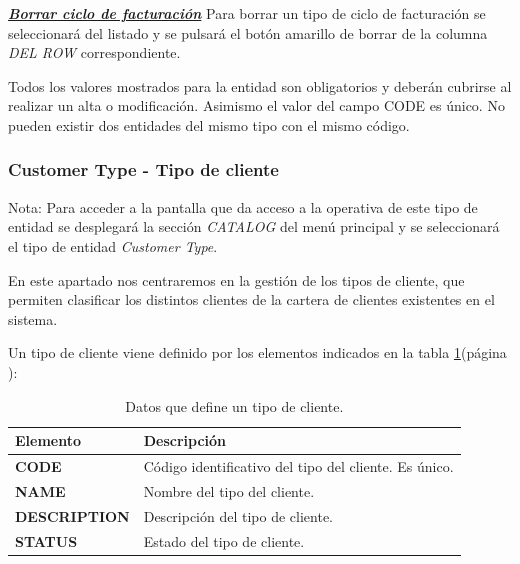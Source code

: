 \underline{\textsl{\textbf{Borrar ciclo de facturación}}}\newline
Para borrar un tipo de ciclo de facturación se seleccionará del listado y se pulsará el botón amarillo de borrar de la columna \textit{DEL ROW} correspondiente.\newline

Todos los valores mostrados para la entidad son obligatorios y deberán cubrirse al realizar un alta o modificación. Asimismo el valor del campo CODE es único. No pueden existir dos entidades del mismo tipo con el mismo código.



\subsubsection{Customer Type - Tipo de cliente}
\label{sub:customer-type}

Nota: Para acceder a la pantalla que da acceso a la operativa de este tipo de entidad se desplegará la sección \emph{CATALOG} del menú principal y se seleccionará el tipo de entidad \emph{Customer Type}.

En este apartado nos centraremos en la gestión de los tipos de cliente, que permiten clasificar los distintos clientes de la cartera de clientes existentes en el sistema.


Un tipo de cliente viene definido por los elementos indicados en la tabla \ref{tab:tipo-cliente}(página \pageref{tab:tipo-cliente}):



\begin{table}[H]
  \centering
  \setlength{\leftmargini}{0.4cm}
  \resizebox{14cm}{!} {
  \begin{tabular}{|m{3cm} m{11cm}|}
  \rowcolor{udcpink!25}
  \hline
  	\textbf{Elemento} & \textbf{Descripción} \\\hline
	\textbf{CODE} & Código identificativo del tipo del cliente. Es único.   \\
	\textbf{NAME} & Nombre del tipo del cliente. \\
	\textbf{DESCRIPTION} & Descripción del tipo de cliente. \\	
	\textbf{STATUS} & Estado del tipo de cliente.
	\\\hline
  \end{tabular}
  } %
  \caption{Datos que define un tipo de cliente.}
  \label{tab:tipo-cliente}
\end{table}

